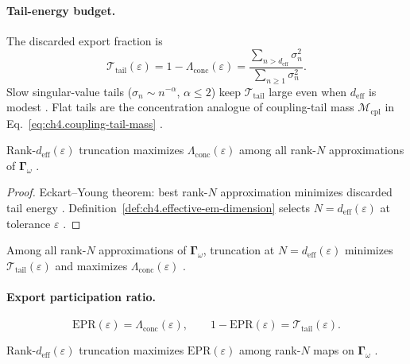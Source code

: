 \paragraph{Tail-energy budget.}
The discarded export fraction is
\begin{equation}
\label{eq:ch4.tail-discard}
\mathcal{T}_{\mathrm{tail}}(\varepsilon)=1-\Lambda_{\mathrm{conc}}(\varepsilon)=\frac{\sum_{n>d_{\mathrm{eff}}}\sigma_{n}^{2}}{\sum_{n\ge1}\sigma_{n}^{2}}.
\end{equation}
Slow singular-value tails (\(\sigma_{n}\sim n^{-\alpha}\), \(\alpha\le2\)) keep \(\mathcal{T}_{\mathrm{tail}}\) large even when \(d_{\mathrm{eff}}\) is modest
\cite{devaney2004,hansen1988,harrington2001}. Flat tails are the concentration analogue of coupling-tail mass
\(\mathcal{M}_{\mathrm{cpl}}\) in Eq.~\eqref{eq:ch4.coupling-tail-mass} \cite{stratton1941}.

\begin{proposition}
\label{prop:ch4.truncation-concentration}
Rank-\(d_{\mathrm{eff}}(\varepsilon)\) truncation maximizes \(\Lambda_{\mathrm{conc}}(\varepsilon)\) among all rank-\(N\) approximations of
\(\boldsymbol{\Gamma}_\omega\) \cite{harrington2001,devaney2004,stratton1941}.
\end{proposition}
\begin{proof}
Eckart--Young theorem: best rank-\(N\) approximation minimizes discarded tail energy \cite{harrington2001}. Definition~\ref{def:ch4.effective-em-dimension}
selects \(N=d_{\mathrm{eff}}(\varepsilon)\) at tolerance \(\varepsilon\) \cite{stratton1941,hansen1988}.
\end{proof}

\begin{theorem}
\label{thm:ch4.eckart-young-conc}
Among all rank-\(N\) approximations of \(\boldsymbol{\Gamma}_\omega\), truncation at \(N=d_{\mathrm{eff}}(\varepsilon)\) minimizes
\(\mathcal{T}_{\mathrm{tail}}(\varepsilon)\) and maximizes \(\Lambda_{\mathrm{conc}}(\varepsilon)\) \cite{harrington2001,devaney2004,stratton1941,hansen1988}.
\end{theorem}

\paragraph{Export participation ratio.}
\begin{equation}
\label{eq:ch4.export-participation}
\mathrm{EPR}(\varepsilon)=\Lambda_{\mathrm{conc}}(\varepsilon),\qquad 1-\mathrm{EPR}(\varepsilon)=\mathcal{T}_{\mathrm{tail}}(\varepsilon).
\end{equation}
\begin{theorem}
\label{thm:ch4.optimal-participation}
Rank-\(d_{\mathrm{eff}}(\varepsilon)\) truncation maximizes \(\mathrm{EPR}(\varepsilon)\) among rank-\(N\) maps on \(\boldsymbol{\Gamma}_\omega\)
\cite{harrington2001,devaney2004,stratton1941}.
\end{theorem}

